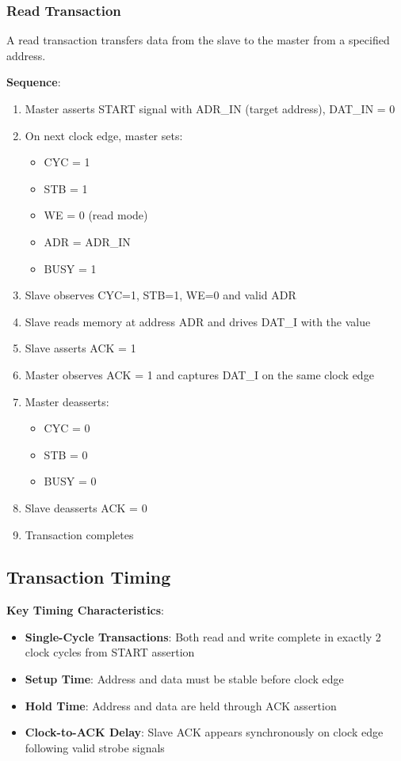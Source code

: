 \documentclass[12pt,a4paper]{article}
\begin{document}
\subsubsection{Read Transaction}
A read transaction transfers data from the slave to the master from a specified address.

\textbf{Sequence}:
\begin{enumerate}
    \item Master asserts START signal with ADR\_IN (target address), DAT\_IN = 0
    \item On next clock edge, master sets:
    \begin{itemize}
        \item CYC = 1
        \item STB = 1
        \item WE = 0 (read mode)
        \item ADR = ADR\_IN
        \item BUSY = 1
    \end{itemize}
    \item Slave observes CYC=1, STB=1, WE=0 and valid ADR
    \item Slave reads memory at address ADR and drives DAT\_I with the value
    \item Slave asserts ACK = 1
    \item Master observes ACK = 1 and captures DAT\_I on the same clock edge
    \item Master deasserts:
    \begin{itemize}
        \item CYC = 0
        \item STB = 0
        \item BUSY = 0
    \end{itemize}
    \item Slave deasserts ACK = 0
    \item Transaction completes
\end{enumerate}

\subsection{Transaction Timing}

\textbf{Key Timing Characteristics}:
\begin{itemize}
    \item \textbf{Single-Cycle Transactions}: Both read and write complete in exactly 2 clock cycles from START assertion
    \item \textbf{Setup Time}: Address and data must be stable before clock edge
    \item \textbf{Hold Time}: Address and data are held through ACK assertion
    \item \textbf{Clock-to-ACK Delay}: Slave ACK appears synchronously on clock edge following valid strobe signals
\end{itemize}
\end{document}
